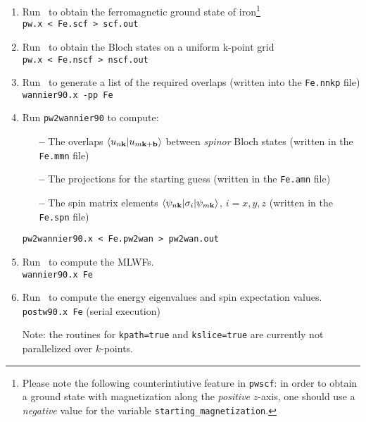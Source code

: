 \documentclass[a4paper,11pt,twoside]{article}
\begin{document}
\begin{enumerate}
\item Run \pwscf\ to obtain the ferromagnetic ground state of
  iron\footnote{Please note the following counterintiutive feature in
    {\tt pwscf}: in order to obtain a ground state with magnetization
    along the {\it positive} $z$-axis, one should use a {\it negative}
    value for the variable {\tt starting\_magnetization}.}\\
  {\tt pw.x < Fe.scf > scf.out}

\item Run \pwscf\ to obtain the Bloch states on a uniform k-point
  grid\\ 
{\tt pw.x < Fe.nscf > nscf.out}

\item Run \wannier\ to generate a list of the required overlaps (written
  into the {\tt Fe.nnkp} file)\\
{\tt wannier90.x -pp Fe}

\item Run {\tt pw2wannier90} to compute:
  \begin{itemize}

  \item[{\bf --}] The overlaps $\langle u_{n{\bf k}}\vert u_{m{\bf
        k}+{\bf b}}\rangle$ between {\it spinor} Bloch states (written
    in the {\tt Fe.mmn} file)

  \item[{\bf --}] The projections for the starting guess (written in
    the {\tt Fe.amn} file)

  \item[{\bf --}] The spin matrix elements $\langle \psi_{n{\bf
        k}}\vert \sigma_i\vert \psi_{m{\bf k}}\rangle$, $i=x,y,z$
    (written in the {\tt Fe.spn} file)
  \end{itemize}
{\tt pw2wannier90.x < Fe.pw2wan > pw2wan.out}

\item Run \wannier\ to compute the MLWFs.\\
{\tt wannier90.x Fe}

\item Run \postw\ to compute the energy eigenvalues and spin
  expectation values.\\
  {\tt postw90.x Fe} (serial execution) 

  Note: the routines for {\tt kpath=true} and {\tt kslice=true} are
  currently not parallelized over $k$-points.\\

\end{enumerate}
\end{document}
